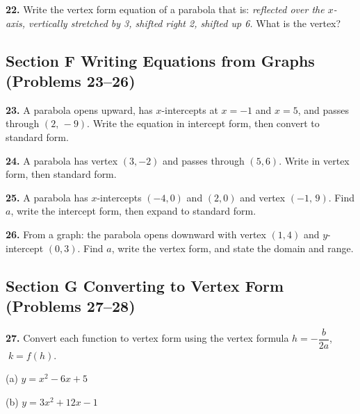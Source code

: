 \documentclass[11pt]{article}
\newcommand{\ws}[1][3cm]{\vspace{#1}}
\begin{document}
\ws[3cm]

\textbf{22.} Write the vertex form equation of a parabola that is:
\textit{reflected over the $x$-axis, vertically stretched by 3, shifted right 2, shifted up 6.}
What is the vertex?

\ws[3cm]

\subsection*{Section F \quad Writing Equations from Graphs (Problems 23--26)}

\textbf{23.} A parabola opens upward, has $x$-intercepts at $x = -1$ and $x = 5$,
and passes through $(2,\,-9)$.
Write the equation in intercept form, then convert to standard form.

\ws[3.5cm]

\textbf{24.} A parabola has vertex $(3, -2)$ and passes through $(5, 6)$.
Write in vertex form, then standard form.

\ws[3.5cm]

\textbf{25.} A parabola has $x$-intercepts $(-4, 0)$ and $(2, 0)$ and vertex $(-1,\,9)$.
Find $a$, write the intercept form, then expand to standard form.

\ws[3.5cm]

\textbf{26.} From a graph: the parabola opens downward with vertex $(1, 4)$ and
$y$-intercept $(0, 3)$.
Find $a$, write the vertex form, and state the domain and range.

\ws[3.5cm]

\subsection*{Section G \quad Converting to Vertex Form (Problems 27--28)}

\textbf{27.} Convert each function to vertex form using the vertex formula
$h = -\dfrac{b}{2a}$, $\; k = f(h)$.

\hspace{1cm}(a) $y = x^2 - 6x + 5$

\ws[3cm]

\hspace{1cm}(b) $y = 3x^2 + 12x - 1$

\ws[3cm]
\end{document}
